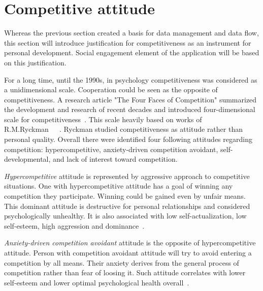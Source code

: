 
\section{Competitive attitude}\label{sec:competitive-attitude}



Whereas the previous section created a basis for data management and data flow,
this section will introduce justification for competitiveness as an instrument for personal development.
Social engagement element of the application will be based on this justification.

For a long time, until the 1990s, in psychology competitiveness was considered as a unidimensional scale.
Cooperation could be seen as the opposite of competitiveness.
A research article "The Four Faces of Competition" summarized the development and research of recent decades
and introduced four-dimensional scale for competitiveness~\cite{the-four-faces-of-competetition}.
This scale heavily based on works of R.M.Ryckman~\cite{cit-ryckman-hca}~\cite{cit-ryckman-adca}~\cite{cit-ryckman-pdca}.
Ryckman studied competitiveness as attitude rather than personal quality.
Overall there were identified four following attitudes regarding competition:
hypercompetitive, anxiety-driven competition avoidant, self-developmental, and lack of interest toward competition.

\textit{Hypercompetitive} attitude is represented by aggressive approach to competitive situations.
One with hypercompetitive attitude has a goal of winning any competition they participate.
Winning could be gained even by unfair means.
This dominant attitude is destructive for personal relationships and considered psychologically unhealthy.
It is also associated with low self-actualization, low self-esteem, high aggression and dominance~\cite{cit-ryckman-hca}.

\textit{Anxiety-driven competition avoidant} attitude is the opposite of hypercompetitive attitude.
Person with competition avoidant attitude will try to avoid entering a competition by all means.
Their anxiety derives from the general process of competition rather than fear of loosing it.
Such attitude correlates with lower self-esteem and lower optimal psychological health overall~\cite{cit-ryckman-adca}.

